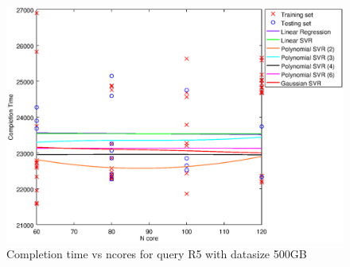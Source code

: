 
\begin {figure}[hbtp]
\centering
\includegraphics[width=\textwidth]{output/R5_500_LINEAR_NCORE/plot_R5_500.eps}
\caption{Completion time vs ncores for query R5 with datasize 500GB}
\label{fig:coreonly_linear_R5_500}
\end {figure}
